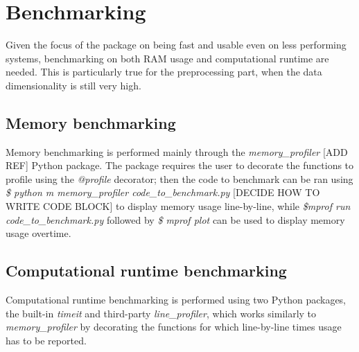
\section{Benchmarking}
Given the focus of the package on being fast and usable even on less performing systems, benchmarking on both RAM usage and computational runtime are needed. This is particularly true for the preprocessing part, when the data dimensionality is still very high.

\subsection{Memory benchmarking}

Memory benchmarking is performed mainly through the \emph{memory\_profiler} [ADD REF] Python package. The package requires the user to decorate the functions to profile using the \emph{@profile} decorator; then the code to benchmark can be ran using \emph{\$ python \-m memory\_profiler code\_to\_benchmark.py} [DECIDE HOW TO WRITE CODE BLOCK] to display memory usage line-by-line, while \emph{\$mprof run code\_to\_benchmark.py} followed by \emph{\$ mprof plot} can be used to display memory usage overtime.

\subsection{Computational runtime benchmarking}

Computational runtime benchmarking is performed using two Python packages, the built-in \emph{timeit} and third-party \emph{line\_profiler}, which works similarly to \emph{memory\_profiler} by decorating the functions for which line-by-line times usage has to be reported. 

